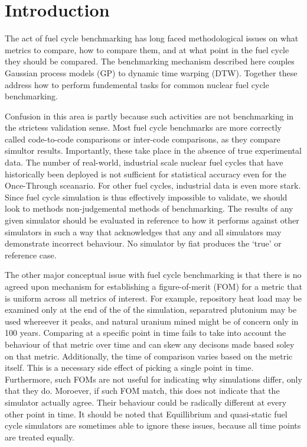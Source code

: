 \section{Introduction}
\label{intro}
The act of fuel cycle benchmarking has long faced methodological issues 
on what metrics to compare, how to compare them, and at what point in the
fuel cycle they should be compared. The benchmarking mechanism described 
here couples Gaussian process models (GP) to dynamic time warping (DTW).
Together these address how to perform fundemental tasks for common nuclear
fuel cycle benchmarking. 

Confusion in this area is partly because such activities 
are not benchmarking in the strictess validation sense. Most fuel
cycle benchmarks are more correctly called code-to-code comparisons or 
inter-code comparisons, as they compare simultor results. Importantly, 
these take place in the absence of true experimental data. The number of 
real-world, industrial scale nuclear fuel cycles that have historically been 
deployed is not sufficient for statistical accuracy even for the Once-Through 
sceanario. For other fuel cycles, industrial data is even more stark. 
Since fuel cycle simulation is thus effectively impossible to validate, 
we should look to methods non-judgemental methods of benchmarking. The 
results of any given simulator should be evaluated in reference to how 
it performs against other simulators in such a way that acknowledges that 
any and all simulators may demonstrate incorrect behaviour. No simulator
by fiat produces the `true' or reference case.

The other major conceptual issue with fuel cycle benchmarking is that there 
is no agreed upon mechanism for establishing a figure-of-merit (FOM) for 
a metric that is uniform across all metrics of interest. For example, 
repository heat load may be examined only at the end of the of the simulation,
separatred plutonium may be used whereever it peaks, and natural uranium 
mined might be of concern only in 100 years. Comparing at a specific point 
in time fails to take into account the behaviour of that metric over time and 
can skew any decisons made based soley on that metric. Additionally, the 
time of comparison varies based on the metric itself. This is a necessary 
side effect of picking a single point in time.
Furthermore, such FOMs are not useful for indicating why simulations differ, 
only that they do. Moroever, if such FOM match, this does not indicate
that the simulator actually agree. Their behaviour could be radically 
different at every other point in time.  It should be noted that 
Equillibrium and quasi-static fuel cycle simulators are sometimes able to 
ignore these issues, because all time points are treated equally.

